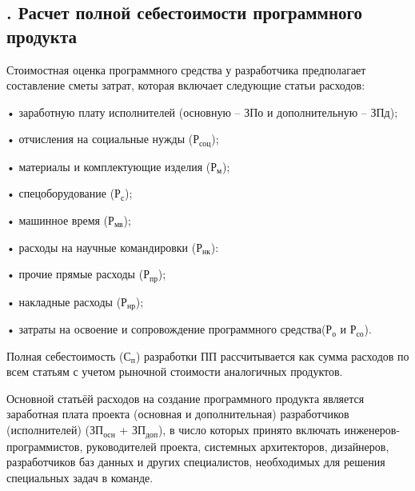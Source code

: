 \subtitlespace

\subsection*{ 
	\gostTitleFont
	\redline
	\thechaptercntr .\thesubchaptercntr \spc
	Расчет полной себестоимости программного продукта
} \addtocounter{subchaptercntr}{1}

\subtitlespace

{\gostFont
	
	\par \redline Стоимостная оценка программного средства у разработчика предполагает составление сметы затрат, которая включает следующие статьи расходов:
	
	\par \redline • заработную плату исполнителей (основную – ЗПо и дополнительную – ЗПд);
	\par \redline •	отчисления на социальные нужды ($\textrm{Р}_{\textrm{соц}}$);
	\par \redline •	материалы и комплектующие изделия ($\textrm{Р}_{\textrm{м}}$);
	\par \redline •	спецоборудование ($\textrm{Р}_{\textrm{с}}$);
	\par \redline •	машинное время ($\textrm{Р}_{\textrm{мв}}$);
	\par \redline •	расходы на научные командировки ($\textrm{Р}_{\textrm{нк}}$):
	\par \redline •	прочие прямые расходы ($\textrm{Р}_{\textrm{пр}}$);
	\par \redline •	накладные расходы ($\textrm{Р}_{\textrm{нр}}$);
	\par \redline •	затраты на освоение и сопровождение программного средства($\textrm{Р}_{\textrm{о}}$ и $\textrm{Р}_{\textrm{со}}$).
	
	\par \redline Полная себестоимость ($\textrm{С}_{\textrm{п}}$) разработки ПП рассчитывается как сумма расходов по всем статьям с учетом рыночной стоимости аналогичных продуктов.
	
	\par \redline Основной статьёй расходов на создание программного продукта является заработная плата проекта (основная и дополнительная) разработчиков (исполнителей) ($\textrm{ЗП}_{\textrm{осн}}$ + $\textrm{ЗП}_{\textrm{доп}}$), в число которых принято включать инженеров-программистов, руководителей проекта, системных архитекторов, дизайнеров, разработчиков баз данных и  других специалистов, необходимых для решения специальных задач в команде.
	 
}
